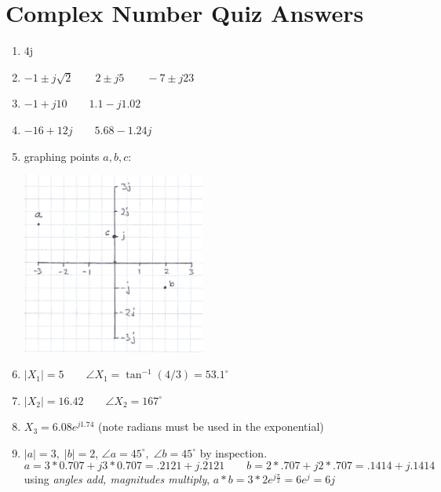 




\newpage
\section{Complex Number Quiz Answers}\label{CN_answers}

\begin{enumerate}
\item 4j

\item $-1\pm j\sqrt{2} \qquad  2\pm j5 \qquad -7\pm j23  $

\item $-1+j10 \qquad 1.1-j1.02$

\item $-16+12j \qquad 5.68-1.24j$

\item graphing points $a,b,c$:

\includegraphics[width=6cm]{figsapdx/00927a.png}

\item $|X_1| = 5 \qquad \angle X_1 = \tan^{-1}(4/3) = 53.1^\circ$

\item $|X_2| = 16.42 \qquad \angle{X_2} = 167^\circ$

\item $X_3 = 6.08e^{j1.74}$ (note radians must be used in the exponential)

\item $|a| = 3, \; |b| = 2$,  $\angle a = 45^\circ,\; \angle b = 45^\circ$  by inspection.
\[
a = 3*0.707 + j3*0.707 = .2121+j.2121 \qquad b = 2*.707 + j2*.707 = .1414+j.1414
\]
using {\it angles add, magnitudes multiply}, $a*b = 3*2e^{j\frac{\pi}{2}} = 6e^j = 6j$

\end{enumerate}


